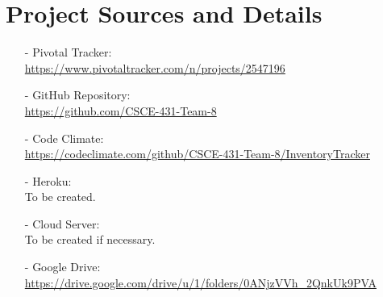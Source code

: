 \documentclass{article}
\begin{document}
    \section{Project Sources and Details}
        \begin{itemize}
            \item[-] Pivotal Tracker:\\
                \url{https://www.pivotaltracker.com/n/projects/2547196}
            \item[-] GitHub Repository:\\
                \url{https://github.com/CSCE-431-Team-8}
            \item[-] Code Climate:\\
                \url{https://codeclimate.com/github/CSCE-431-Team-8/InventoryTracker}
            \item[-] Heroku:\\
                To be created.
            \item[-] Cloud Server:\\
                To be created if necessary.
            \item[-] Google Drive:\\
                \url{https://drive.google.com/drive/u/1/folders/0ANjzVVh_2QnkUk9PVA}
        \end{itemize}
\end{document}
